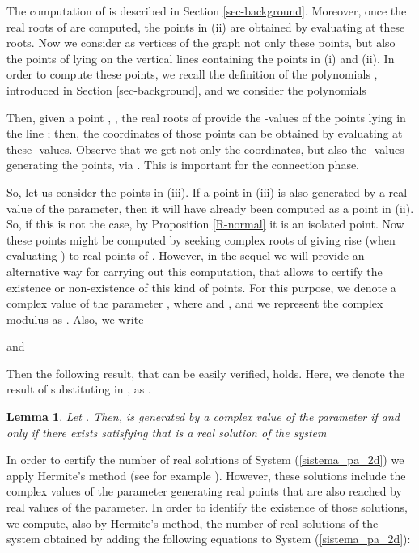 \documentclass{elsart}
\newtheorem{lemma}[theorem]{{\bf Lemma}}
\begin{document}
    The computation of  is described in Section
    \ref{sec-background}. Moreover, once the real roots of
     are computed, the points in (ii) are obtained by
    evaluating  at these roots. Now we consider as vertices of the graph  not only these points, but
    also the points of  lying on the vertical lines
    containing the points in (i) and (ii). In order to compute these points, we recall
    the definition of the polynomials
, introduced in Section
\ref{sec-background}, and we consider the polynomials

Then, given a point , , the real roots of  provide the -values of the
points lying in the line ; then, the coordinates of those
points can be obtained by evaluating  at these
-values. Observe that we get not only the coordinates, but also
the -values generating the points, via . This is
important for the connection phase.

So, let us consider the points in (iii). If a point in (iii) is
also generated by a real value of the parameter, then it will have
already been computed as a point in (ii). So, if this is not the
case, by Proposition \ref{R-normal} it is an isolated point. Now
these points might
    be computed by seeking complex
    roots of  giving rise (when evaluating ) to real points of .
    However, in the sequel we will provide an alternative way for carrying out this computation,
    that allows to certify the existence or non-existence of this kind of points. For this purpose, we denote a
complex value of the parameter , where  and
, and we represent the complex modulus as . Also, we write
    
and

Then the following result, that can be easily verified, holds. Here, we denote
the result of substituting  in , as .

\begin{lemma} \label{comp-isol}
Let . Then,  is generated
by a complex value of the parameter  if and only if
there exists  satisfying that  is
a real solution of the system

\end{lemma}



In order to certify the number of real solutions of System
(\ref{sistema_pa_2d}) we apply Hermite's method (see for example
\cite{cox}). However, these solutions include the complex values
of the parameter generating real points that are also reached by
real values of the parameter. In order to identify the existence
of those solutions, we compute, also by Hermite's method, the
number of real solutions of the system obtained by adding the
following equations to System (\ref{sistema_pa_2d}):
\end{document}
